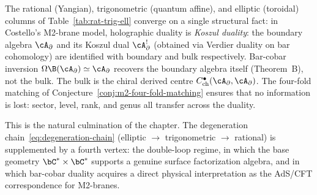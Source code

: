 \begin{remark}
\label{rem:bar-cobar-is-holographic}
The rational (Yangian), trigonometric
(quantum affine), and elliptic (toroidal) columns of
Table~\ref{tab:rat-trig-ell} converge on a single structural
fact: in Costello's M2-brane model, holographic duality is
\emph{Koszul duality}: the boundary algebra $\cA_\partial$
and its Koszul dual $\cA^!_\partial$ (obtained via Verdier
duality on bar cohomology) are identified with boundary and
bulk respectively. Bar-cobar inversion
$\Omega\B(\cA_\partial) \simeq \cA_\partial$ recovers the
boundary algebra itself (Theorem~B), not the bulk. The bulk
is the chiral derived centre
$C^\bullet_{\mathrm{ch}}(\cA_\partial, \cA_\partial)$.
The four-fold matching of
Conjecture~\ref{conj:m2-four-fold-matching} ensures that no
information is lost: sector, level, rank, and genus all transfer
across the duality.

This is the natural culmination of the chapter. The degeneration
chain~\eqref{eq:degeneration-chain} (elliptic $\to$ trigonometric
$\to$ rational) is supplemented by a fourth vertex: the double-loop
regime, in which the base geometry $\bC^* \times \bC^*$ supports a
genuine surface factorization algebra, and in which bar-cobar duality
acquires a direct physical interpretation as the AdS/CFT
correspondence for M2-branes.
\end{remark}

